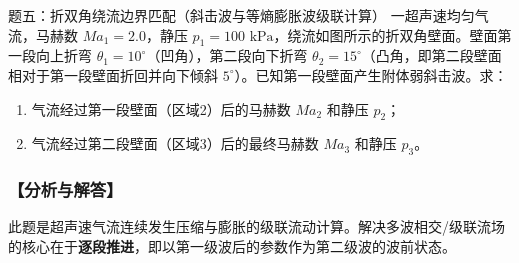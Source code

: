 \documentclass[11pt,a4paper]{ctexart}
\begin{document}
\newpage

\begin{questionbox}{题五：折双角绕流边界匹配（斜击波与等熵膨胀波级联计算）}
一超声速均匀气流，马赫数 $Ma_1 = 2.0$，静压 $p_1 = 100\text{ kPa}$，绕流如图所示的折双角壁面。壁面第一段向上折弯 $\theta_1 = 10^\circ$（凹角），第二段向下折弯 $\theta_2 = 15^\circ$（凸角，即第二段壁面相对于第一段壁面折回并向下倾斜 $5^\circ$）。已知第一段壁面产生附体弱斜击波。求：
\begin{enumerate}
    \item 气流经过第一段壁面（区域2）后的马赫数 $Ma_2$ 和静压 $p_2$；
    \item 气流经过第二段壁面（区域3）后的最终马赫数 $Ma_3$ 和静压 $p_3$。
\end{enumerate}
\end{questionbox}

\subsubsection*{【分析与解答】}
此题是超声速气流连续发生压缩与膨胀的级联流动计算。解决多波相交/级联流场的核心在于\textbf{逐段推进}，即以第一级波后的参数作为第二级波的波前状态。
\end{document}
